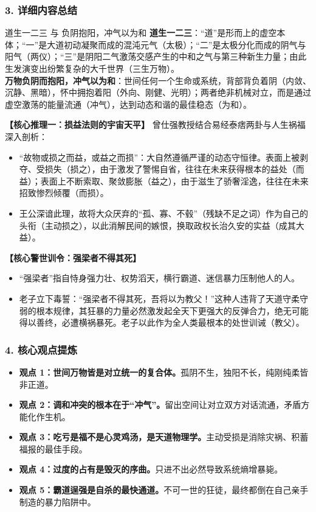 \subsubsection{3. 详细内容总结}

\begin{ConceptBox}{道生一二三 与 负阴抱阳，冲气以为和}
\textbf{道生一二三}：“道”是形而上的虚空本体；“一”是大道初动凝聚而成的混沌元气（太极）；“二”是太极分化而成的阴气与阳气（两仪）；“三”是阴阳二气激荡交感产生的中和之气与第三种新生力量；由此生发演变出纷繁复杂的大千世界（三生万物）。\\
\textbf{万物负阴而抱阳，冲气以为和}：世间任何一个生命或系统，背部背负着阴（内敛、沉静、黑暗），怀中拥抱着阳（外向、刚健、光明）；两者绝非机械对立，而是通过虚空激荡的能量流通（冲气），达到动态和谐的最佳稳态（为和）。
\end{ConceptBox}

\noindent\textbf{【核心推理一：损益法则的宇宙天平】}
曾仕强教授结合易经泰痞两卦与人生祸福深入剖析：
\begin{itemize}
    \item “故物或损之而益，或益之而损”：大自然遵循严谨的动态守恒律。表面上被剥夺、受损失（损之），由于激发了警惕自省，往往在未来获得根本的益处（而益）；表面上不断索取、聚敛膨胀（益之），由于滋生了骄奢淫逸，往往在未来招致惨烈倾覆（而损）。
    \item 王公深谙此理，故将大众厌弃的“孤、寡、不毂”（残缺不足之词）作为自己的头衔（主动损之），以此消解民间的嫉恨，换取政权长治久安的实益（成其大益）。
\end{itemize}

\noindent\textbf{【核心警世训令：强梁者不得其死】}
\begin{itemize}
    \item “强梁者”指自恃身强力壮、权势滔天，横行霸道、迷信暴力压制他人的人。
    \item 老子立下毒誓：“强梁者不得其死，吾将以为教父！”这种人违背了天道守柔守弱的根本规律，其狂暴的力量必然激发起全天下更强大的反弹合力，绝无可能得以善终，必遭横祸暴死。老子以此作为全人类最根本的处世训诫（教父）。
\end{itemize}

\subsubsection{4. 核心观点提炼}
\begin{itemize}
    \item \textbf{观点 1：世间万物皆是对立统一的复合体。}孤阴不生，独阳不长，纯刚纯柔皆非正道。
    \item \textbf{观点 2：调和冲突的根本在于“冲气”。}留出空间让对立双方对话流通，矛盾方能化作生机。
    \item \textbf{观点 3：吃亏是福不是心灵鸡汤，是天道物理学。}主动受损是消除灾祸、积蓄福报的最佳手段。
    \item \textbf{观点 4：过度的占有是毁灭的序曲。}只进不出必然导致系统熵增暴毙。
    \item \textbf{观点 5：霸道逞强是自杀的最快通道。}不可一世的狂徒，最终都倒在自己亲手制造的暴力陷阱中。
\end{itemize}

